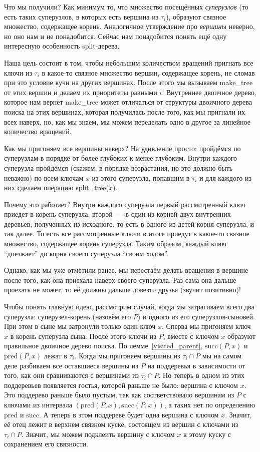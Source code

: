 Что мы получили? Как минимум то, что множество посещённых \emph{суперузлов} (то есть таких суперузлов, в которых есть вершина из $\tau_i$), образуют связное множество, содержащее корень. Аналогичное утверждение про \emph{вершины} неверно, но оно нам и не понадобится. Сейчас нам понадобится понять ещё одну интересную особенность split-дерева.

Наша цель состоит в том, чтобы небольшим количеством вращений пригнать все
ключи из $\tau_i$ в какое-то связное множество вершин, содержащее корень,
не сломав при это условие кучи на других вершинах.
После этого мы вызываем \textrm{make\_tree} от этих вершин и делаем их приоритеты
равными $i$. Внутреннее двоичное дерево, которое нам вернёт \textrm{make\_tree}
может отличаться от структуры двоичного дерева поиска на этих вершинах, которая получилась после того, как мы пригнали их всех наверх, но, как мы знаем, мы можем переделать одно в другое за линейное количество вращений.

Как мы пригоняем все вершины наверх? На удивление просто: пройдёмся по суперузлам в порядке от более глубоких к менее глубоким. Внутри каждого суперузла пройдёмся (скажем, в порядке возрастания, но это должно быть неважно) по всем ключам $x$ из этого суперузла, попавшим в $\tau_i$ и для каждого из них сделаем операцию
\textrm{split\_tree}($x$).

Почему это работает? Внутри каждого суперузла первый рассмотренный ключ приедет в корень суперузла, второй~--- в один из корней двух внутренних деревьев, полученных из исходного, то есть в одного из детей корня суперузла, и так далее. То есть все рассмотренные ключи в итоге приедут в какое-то связное множество, содержащее корень суперузла. Таким образом, каждый ключ ``доезжает'' до корня своего суперузла ``своим ходом''.

Однако, как мы уже отметили ранее, мы перестаём делать вращения в вершине после того, как она приехала наверх своего суперузла. Раз сама она дальше проехать не может, то её должны
дальше довезти друзья (звучит позитивно)!

Чтобы понять главную идею, рассмотрим случай, когда мы затрагиваем всего два суперузла: суперузел-корень (назовём его $P$) и одного из его суперузлов-сыновей. При этом в сыне мы затронули только один ключ $x$. Сперва мы пригоняем ключ $x$ в корень суперузла сына.
После этого ключи из $P$, вместе с ключом $x$ образуют правильное двоичное дерево поиска.
По лемме~\ref{visited_parent}, $\mathrm{succ}(P, x)$ и $\mathrm{pred}(P, x)$ лежат в $\tau_i$. Когда мы пригоняем вершины из $\tau_i \cap P$ мы на самом деле разбиваем все оставшиеся вершины из $P$ на поддеревья в зависимости от того, как они сравниваются с вершинами из $\tau_i \cap P$. Но теперь в одном из этих поддеревьев появляется гостья, которой раньше не было: вершина с ключом $x$. Это поддерево раньше было пустым, так как соответствовало вершинам из $P$ с ключами из интервала $(\mathrm{pred}(P, x), \mathrm{succ}(P, x))$, а таких нет по определению $\mathrm{pred}$ и $\mathrm{succ}$. А теперь в этом поддереве будет одна вершина с ключом $x$. Значит, её отец лежит в верхнем связном куске, состоящем из вершин с ключами из $\tau_i \cap P$. Значит, мы можем подклеить вершину с ключом $x$ к этому куску с сохранением его связности.

